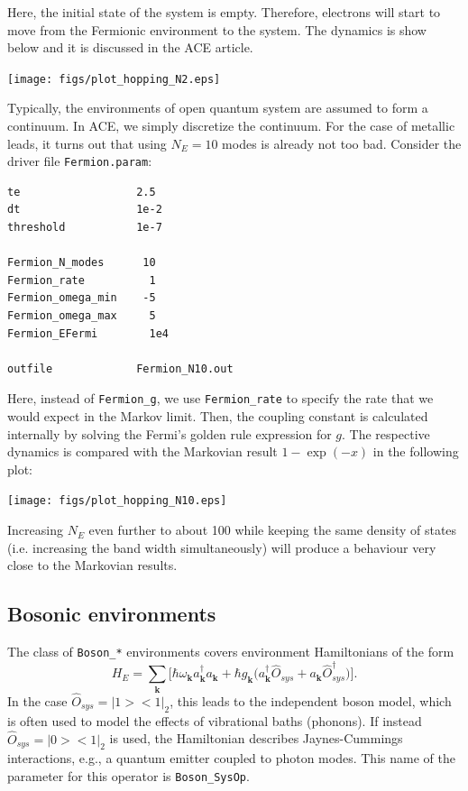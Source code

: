 \documentclass{scrartcl}
\begin{document}
Here, the initial state of the system is empty. Therefore, electrons will 
start to move from the Fermionic environment to the system.
The dynamics is show below and it is discussed in the ACE article.

\texttt{[image: figs/plot\_hopping\_N2.eps]}


Typically, the environments of open quantum system are assumed to form 
a continuum. In ACE, we simply discretize the continuum. For the case 
of metallic leads, it turns out that using $N_E=10$ modes is already
not too bad. 
Consider the driver file \verb+Fermion.param+:

\noindent\makebox[5cm]{\rule{7cm}{0.4pt}}
\begin{verbatim}
te                  2.5
dt                  1e-2
threshold           1e-7

Fermion_N_modes      10
Fermion_rate          1 
Fermion_omega_min    -5
Fermion_omega_max     5
Fermion_EFermi        1e4

outfile             Fermion_N10.out
\end{verbatim}
\noindent\makebox[5cm]{\rule{7cm}{0.4pt}}

Here, instead of \verb+Fermion_g+, we use \verb+Fermion_rate+ to specify the 
rate that we would expect in the Markov limit. Then, the coupling constant  
is calculated internally by solving the Fermi's golden rule expression for $g$.
The respective dynamics is compared with the Markovian result
$1-\exp(-x)$ in the following plot:

\texttt{[image: figs/plot\_hopping\_N10.eps]}

Increasing $N_E$ even further to about 100 while keeping the same density of 
states (i.e. increasing the band width simultaneously) will produce a behaviour
very close to the Markovian results.


\subsection{Bosonic environments}
The class of \verb+Boson_*+ environments covers environment 
Hamiltonians of the form
\begin{equation}
H_E=
\sum_{\mathbf{k}} \bigg[\hbar\omega_\mathbf{k}a^\dagger_\mathbf{k}a_\mathbf{k}
+ \hbar g_\mathbf{k}\big(a^\dagger_\mathbf{k} \hat{O}_{sys}
+a_\mathbf{k} \hat{O}_{sys}^\dagger\big) \bigg].
\end{equation}
In the case $\hat{O}_{sys}=|1><1|_2$, this leads to the independent boson model,
which is often used to model the effects of vibrational baths (phonons).
If instead $\hat{O}_{sys}=|0><1|_2$ is used, the Hamiltonian describes 
Jaynes-Cummings interactions, e.g., a quantum emitter coupled to
photon modes. This name of the parameter for this operator is 
\verb+Boson_SysOp+.
\end{document}
